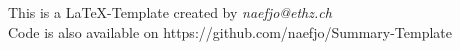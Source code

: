 



\maketitle
\begin{center}
This is a \LaTeX-Template created by \textit{naefjo@ethz.ch}\\
Code is also available on https://github.com/naefjo/Summary-Template
\end{center}
\newpage
\begin{multicols*}{3}



\end{multicols*}     

